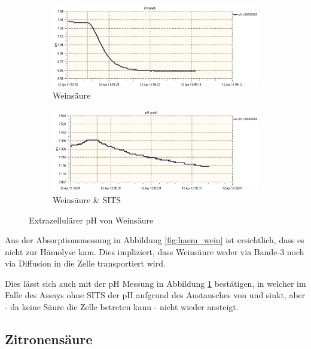 \documentclass[a4paper,german]{scrreprt}
\begin{document}
\begin{figure}
	\centering
	\begin{subfigure}{.5\textwidth}
		\centering
		\includegraphics[width=\linewidth]{img/ph_wein.png}
		\caption{Weinsäure}
	\end{subfigure}%
	\begin{subfigure}{.5\textwidth}
		\centering
		\includegraphics[width=\linewidth]{img/ph_wein_sits.png}
		\caption{Weinsäure \& SITS}
	\end{subfigure}
	\caption{Extrazellulärer pH von Weinsäure}
	\label{fig:ph_wein}
\end{figure}

Aus der Absorptionsmessung in Abbildung \ref{fig:haem_wein} ist ersichtlich,
dass es nicht zur Hämolyse kam. Dies impliziert, dass Weinsäure weder via
Bande-3 noch via Diffusion in die Zelle transportiert wird.

Dies lässt sich auch mit der pH Messung in Abbildung \ref{fig:ph_wein}
bestätigen, in welcher im Falle des Assays ohne SITS der pH aufgrund des
Austausches von  und  sinkt, aber - da keine Säure die Zelle
betreten kann - nicht wieder ansteigt.

\subsection{Zitronensäure}
\end{document}
